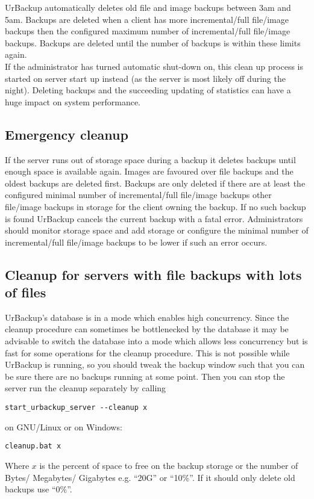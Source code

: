 \documentclass[a4paper,10pt]{article}
\begin{document}
UrBackup automatically deletes old file and image backups between 3am and 5am. Backups are deleted when a client has more incremental/full file/image backups then the configured maximum number of incremental/full file/image backups. Backups are deleted until the number of backups is within these limits again.\\
If the administrator has turned automatic shut-down on, this clean up process is started on server start up instead (as the server is most likely off during the night). Deleting backups and the succeeding updating of statistics can have a huge impact on system performance.

\subsection{Emergency cleanup}

If the server runs out of storage space during a backup it deletes backups until enough space is available again. Images are favoured over file backups and the oldest backups are deleted first. Backups are only deleted if there are at least the configured minimal number of incremental/full file/image backups other file/image backups in storage for the client owning the backup. If no such backup is found UrBackup cancels the current backup with a fatal error. Administrators should monitor storage space and add storage or configure the minimal number of incremental/full file/image backups to be lower if such an error occurs.

\subsection{Cleanup for servers with file backups with lots of files}

UrBackup's database is in a mode which enables high concurrency. Since the cleanup procedure
can sometimes be bottlenecked by the database it may be advisable to switch the database into
a mode which allows less concurrency but is fast for some operations for the cleanup procedure. This is not possible while UrBackup is running, so you should tweak the backup window such that you can be sure there are no backups running at some point. Then you can stop the server run the cleanup separately by calling
\begin{verbatim}
start_urbackup_server --cleanup x
\end{verbatim}
on GNU/Linux or on Windows:
\begin{verbatim}
cleanup.bat x
\end{verbatim}
Where $x$ is the percent of space to free on the backup storage or the number of Bytes/ Megabytes/ Gigabytes e.g. ``20G'' or ``10\%''. If it should only delete old backups
use ``0\%''.
\end{document}
